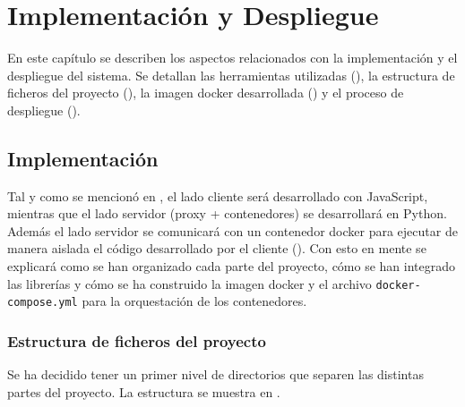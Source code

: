 \chapter{Implementación y Despliegue}\label{chap:implementacion_y_despliegue}
En este capítulo se describen los aspectos relacionados con la implementación y el despliegue del sistema. Se detallan las herramientas utilizadas (), la estructura de ficheros del proyecto (), la imagen docker desarrollada () y el proceso de despliegue ().

\section{Implementación} \label{sec:implementacion}
Tal y como se mencionó en , el lado cliente será desarrollado con JavaScript, mientras que el lado servidor (proxy + contenedores) se desarrollará en Python. Además el lado servidor se comunicará con un contenedor docker para ejecutar de manera aislada el código desarrollado por el cliente (). Con esto en mente se explicará como se han organizado cada parte del proyecto, cómo se han integrado las librerías y cómo se ha construido la imagen docker y el archivo \texttt{docker-compose.yml} para la orquestación de los contenedores.  

\subsection{Estructura de ficheros del proyecto}\label{subsec:estructura_ficheros_proyecto}

Se ha decidido tener un primer nivel de directorios que separen las distintas partes del proyecto. La estructura se muestra en .   

\begin{figure}[H]
    {
    \begin{tcolorbox}
    \end{tcolorbox}
    }
\end{figure}

